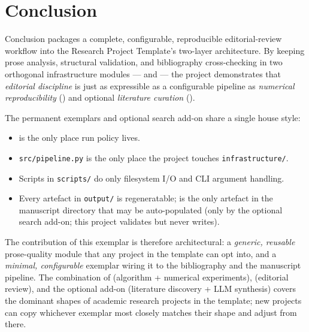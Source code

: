 \documentclass[
  ignorenonframetext,
]{beamer}
\author{\texorpdfstring{}{}}
\date{}
\providecommand{\tightlist}{%
  \setlength{\itemsep}{0pt}\setlength{\parskip}{0pt}}
\begin{document}
\section{Conclusion}\label{sec:conclusion}

\begin{frame}{Conclusion}
 packages a complete, configurable,
reproducible editorial-review workflow into the Research Project
Template's two-layer architecture. By keeping prose analysis, structural
validation, and bibliography cross-checking in two orthogonal
infrastructure modules ---  and
 --- the project demonstrates that
\emph{editorial discipline} is just as expressible as a configurable
pipeline as \emph{numerical reproducibility}
() and optional \emph{literature
curation} ().

The permanent exemplars and optional search add-on share a single house
style:

\begin{itemize}
\tightlist
\item
   is the only place run policy lives.
\item
  \texttt{src/pipeline.py} is the only place the project touches
  \texttt{infrastructure/}.
\item
  Scripts in \texttt{scripts/} do only filesystem I/O and CLI argument
  handling.
\item
  Every artefact in \texttt{output/} is regeneratable;
   is the only artefact in the
  manuscript directory that may be auto-populated (only by the optional
  search add-on; this project validates but never writes).
\end{itemize}

The contribution of this exemplar is therefore architectural: a
\emph{generic, reusable} prose-quality module that any project in the
template can opt into, and a \emph{minimal, configurable} exemplar
wiring it to the bibliography and the manuscript pipeline. The
combination of  (algorithm + numerical
experiments),  (editorial review), and
the optional  add-on
(literature discovery + LLM synthesis) covers the dominant shapes of
academic research projects in the template; new projects can copy
whichever exemplar most closely matches their shape and adjust from
there.


\end{frame}
\end{document}
